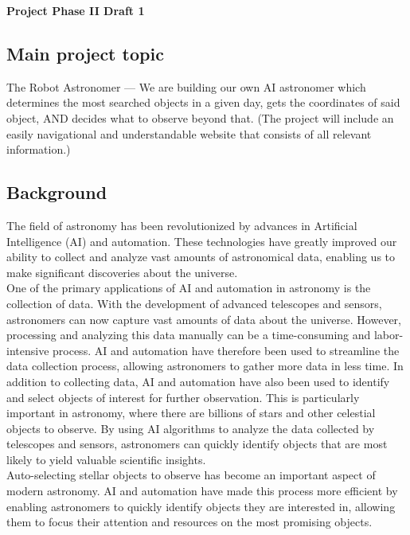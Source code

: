 \documentclass[12pt,letterpaper]{article}
\begin{document}
  \thispagestyle{firstpagestyle}
  \begin{center}
    {\huge \textbf{Project Phase II Draft 1}}
  \end{center}

    
\subsection*{Main project topic}
The Robot Astronomer — We are building our own AI astronomer which determines the most 
searched objects in a given day, gets the coordinates of said object, AND decides what 
to observe beyond that. (The project will include an easily navigational and 
understandable website that consists of all relevant information.)

\subsection*{Background}
The field of astronomy has been revolutionized by advances in Artificial Intelligence 
(AI) and automation. These technologies have greatly improved our ability to collect 
and analyze vast amounts of astronomical data, enabling us to make significant 
discoveries about the universe.\\

One of the primary applications of AI and automation in astronomy is the collection 
of data. With the development of advanced telescopes and sensors, astronomers can now 
capture vast amounts of data about the universe. However, processing and analyzing 
this data manually can be a time-consuming and labor-intensive process. AI and automation 
have therefore been used to streamline the data collection process, allowing astronomers 
to gather more data in less time. In addition to collecting data, AI and automation have 
also been used to identify and select objects of interest for further observation. 
This is particularly important in astronomy, where there are billions of stars and 
other celestial objects to observe. By using AI algorithms to analyze the data collected 
by telescopes and sensors, astronomers can quickly identify objects that are most likely 
to yield valuable scientific insights.\\

Auto-selecting stellar objects to observe has become an important aspect of modern 
astronomy. AI and automation have made this process more efficient by enabling astronomers 
to quickly identify objects they are interested in, allowing them to focus their 
attention and resources on the most promising objects.\\
\end{document}
